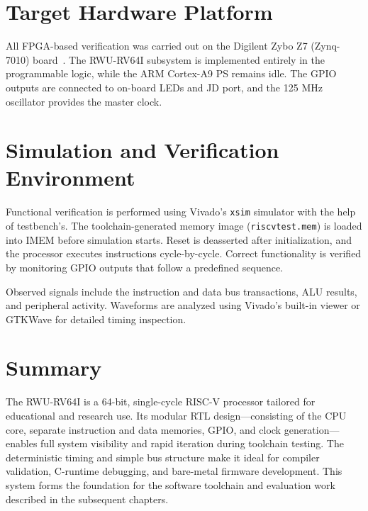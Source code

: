 \section{Target Hardware Platform}
All FPGA-based verification was carried out on the Digilent Zybo Z7 (Zynq-7010) board~\cite{zybo-datasheet}.  
The RWU-RV64I subsystem is implemented entirely in the programmable logic, while the ARM Cortex-A9 PS remains idle.  
The GPIO outputs are connected to on-board LEDs and JD port, and the 125 MHz oscillator provides the master clock.


\section{Simulation and Verification Environment}
Functional verification is performed using Vivado’s \texttt{xsim} simulator with the help of testbench's.  
The toolchain-generated memory image (\texttt{riscvtest.mem}) is loaded into IMEM before simulation starts.  
Reset is deasserted after initialization, and the processor executes instructions cycle-by-cycle.  
Correct functionality is verified by monitoring GPIO outputs that follow a predefined sequence.


Observed signals include the instruction and data bus transactions, ALU results, and peripheral activity.  
Waveforms are analyzed using Vivado’s built-in viewer or GTKWave for detailed timing inspection.

\section{Summary}
The RWU-RV64I is a 64-bit, single-cycle RISC-V processor tailored for educational and research use.  
Its modular RTL design—consisting of the CPU core, separate instruction and data memories, GPIO, and clock generation—enables full system visibility and rapid iteration during toolchain testing.  
The deterministic timing and simple bus structure make it ideal for compiler validation, C-runtime debugging, and bare-metal firmware development.  
This system forms the foundation for the software toolchain and evaluation work described in the subsequent chapters.
